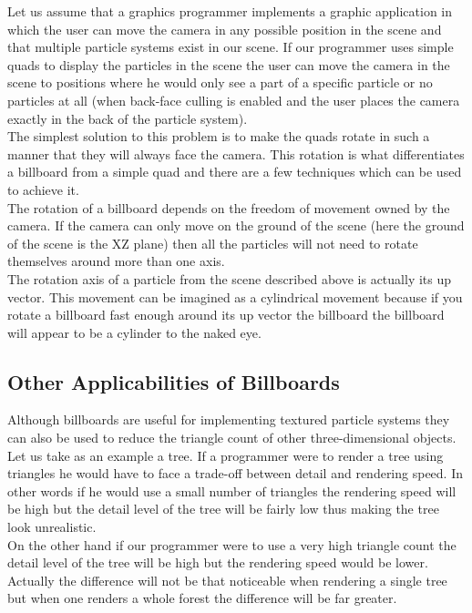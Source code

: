 Let us assume that a graphics programmer implements a graphic application in which the user can move the camera in any possible position in the scene and that multiple particle systems exist in our scene. If our programmer uses simple quads to display the particles in the scene the user can move the camera in the scene to positions where he would only see a part of a specific particle or no particles at all (when back-face culling is enabled and the user places the camera exactly in the back of the particle system).\\

The simplest solution to this problem is to make the quads rotate in such a manner that they will always face the camera. This rotation is what differentiates a billboard from a simple quad and there are a few techniques which can be used to achieve it.\\

The rotation of a billboard depends on the freedom of movement owned by the camera. If the camera can only move on the ground of the scene (here the ground of the scene is the XZ plane) then all the particles will not need to rotate themselves around more than one axis.\\

The rotation axis of a particle from the scene described above is actually its up vector. This movement can be imagined as a cylindrical movement because if you rotate a billboard fast enough around its up vector the billboard the billboard will appear to be a cylinder to the naked eye.\\

\newpage
\subsection{Other Applicabilities of Billboards}
Although billboards are useful for implementing textured particle systems they can also be used to reduce the triangle count of other three-dimensional objects.\\

Let us take as an example a tree. If a programmer were to render a tree using triangles he would have to face a trade-off between detail and rendering speed. In other words if he would use a small number of triangles the rendering speed will be high but the detail level of the tree will be fairly low thus making the tree look unrealistic.\\

On the other hand if our programmer were to use a very high triangle count the detail level of the tree will be high but the rendering speed would be lower. Actually the difference will not be that noticeable when rendering a single tree but when one renders a whole forest the difference will be far greater.\\

